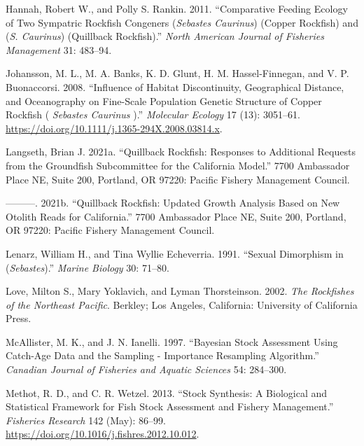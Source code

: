 \documentclass[11pt,
  english,
  a4paper,
]{article}
\begin{document}
\leavevmode\hypertarget{ref-HannahandRankin_rockfish_site_fidelity_2011}{}%
Hannah, Robert W., and Polly S. Rankin. 2011. ``Comparative Feeding Ecology of Two Sympatric Rockfish Congeners (\emph{Sebastes Caurinus}) (Copper Rockfish) and (\emph{S. Caurinus}) (Quillback Rockfish).'' \emph{North American Journal of Fisheries Management} 31: 483--94.

\leavevmode\hypertarget{ref-johansson_influence_2008}{}%
Johansson, M. L., M. A. Banks, K. D. Glunt, H. M. Hassel-Finnegan, and V. P. Buonaccorsi. 2008. ``Influence of Habitat Discontinuity, Geographical Distance, and Oceanography on Fine-Scale Population Genetic Structure of Copper Rockfish ( \emph{Sebastes Caurinus} ).'' \emph{Molecular Ecology} 17 (13): 3051--61. \url{https://doi.org/10.1111/j.1365-294X.2008.03814.x}.

\leavevmode\hypertarget{ref-Langseth_augrequests_2021}{}%
Langseth, Brian J. 2021a. ``Quillback Rockfish: Responses to Additional Requests from the Groundfish Subcommittee for the California Model.'' 7700 Ambassador Place NE, Suite 200, Portland, OR 97220: Pacific Fishery Management Council.

\leavevmode\hypertarget{ref-Langseth_mopupgrowth_2021}{}%
---------. 2021b. ``Quillback Rockfish: Updated Growth Analysis Based on New Otolith Reads for California.'' 7700 Ambassador Place NE, Suite 200, Portland, OR 97220: Pacific Fishery Management Council.

\leavevmode\hypertarget{ref-LenarzandEcheverria_dimorphism_1991}{}%
Lenarz, William H., and Tina Wyllie Echeverria. 1991. ``Sexual Dimorphism in (\emph{Sebastes}).'' \emph{Marine Biology} 30: 71--80.

\leavevmode\hypertarget{ref-loveetal_2002}{}%
Love, Milton S., Mary Yoklavich, and Lyman Thorsteinson. 2002. \emph{The Rockfishes of the Northeast Pacific}. Berkley; Los Angeles, California: University of California Press.

\leavevmode\hypertarget{ref-mcallister_bayesian_1997}{}%
McAllister, M. K., and J. N. Ianelli. 1997. ``Bayesian Stock Assessment Using Catch-Age Data and the Sampling - Importance Resampling Algorithm.'' \emph{Canadian Journal of Fisheries and Aquatic Sciences} 54: 284--300.

\leavevmode\hypertarget{ref-methot_stock_2013}{}%
Methot, R. D., and C. R. Wetzel. 2013. ``Stock Synthesis: A Biological and Statistical Framework for Fish Stock Assessment and Fishery Management.'' \emph{Fisheries Research} 142 (May): 86--99. \url{https://doi.org/10.1016/j.fishres.2012.10.012}.
\end{document}
